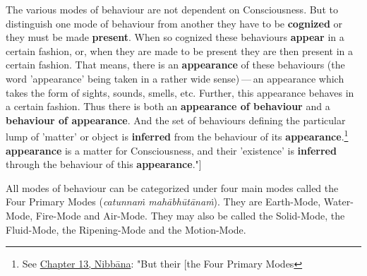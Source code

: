 The various modes of behaviour are not dependent on Consciousness. But to distinguish one mode of behaviour from another they have to be \textbf{cognized} or they must be made \textbf{present}. When so cognized these behaviours \textbf{appear} in a certain fashion, or, when they are made to be present they are then present in a certain fashion. That means, there is an \textbf{appearance} of these behaviours (the word 'appearance' being taken in a rather wide sense) --- an appearance which takes the form of sights, sounds, smells, etc. Further, this appearance behaves in a certain fashion. Thus there is both an \textbf{appearance of behaviour} and a \textbf{behaviour of appearance}. And the set of behaviours defining the particular lump of 'matter' or object is \textbf{inferred} from the behaviour of its \textbf{appearance}.\footnote{See \href{ch-13-nibbana.xml\#the-four-primary}{Chapter 13, Nibbāna}: "But their {[}the Four Primary Modes} \textbf{appearance} is a matter for Consciousness, and their 'existence' is \textbf{inferred} through the behaviour of this \textbf{appearance}."{]}

All modes of behaviour can be categorized under four main modes called the Four Primary Modes (\emph{catunnaṁ mahābhūtānaṁ}). They are Earth-Mode, Water-Mode, Fire-Mode and Air-Mode. They may also be called the Solid-Mode, the Fluid-Mode, the Ripening-Mode and the Motion-Mode.

